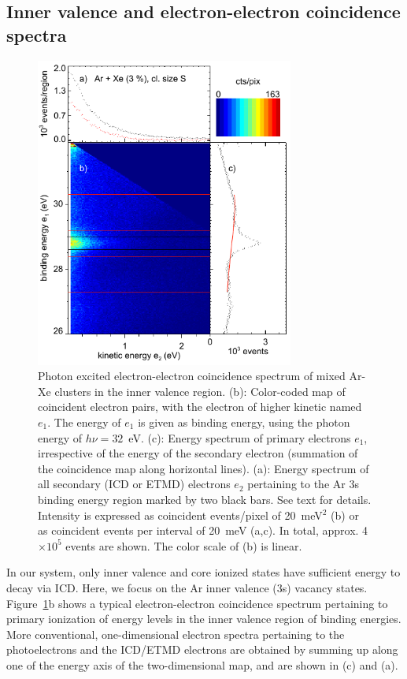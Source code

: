 \subsection{Inner valence and electron-electron coincidence spectra}
%
\begin{figure}[ht]
 \centering
 \includegraphics[width=8.5cm]{pics/figure_map.pdf}
 \caption{
Photon excited electron-electron coincidence spectrum of mixed Ar-Xe clusters in the inner valence region. 
(b): Color-coded map of coincident electron pairs, with the electron of higher kinetic named $e_1$. 
The energy of $e_1$ is given as binding energy, using the photon energy of $h\nu = 32$~eV. 
(c): Energy spectrum of primary electrons $e_1$, irrespective of the energy of the secondary electron (summation of the coincidence map along horizontal lines). 
(a): Energy spectrum of all secondary (ICD or ETMD) electrons $e_2$ pertaining to the Ar 3s binding energy region marked by two black bars. 
See text for details. 
Intensity is expressed as coincident events/pixel of 20~meV$^2$ (b) or as coincident events per interval of 20~meV (a,c). 
In total, approx. 4$\times 10^5$ events are shown. 
The color scale of (b) is linear.
 \label{figure:map}
 }
\end{figure}
%
In our system, only inner valence and core ionized states have sufficient energy to decay via ICD. 
Here, we focus on the Ar inner valence (3s) vacancy states. 
Figure\ \ref{figure:map}b shows a typical electron-electron coincidence spectrum pertaining to primary ionization of energy levels in the inner valence region of binding energies.
More conventional, one-dimensional electron spectra pertaining to the photoelectrons and the ICD/ETMD electrons are obtained by summing up along one of the energy axis of the two-dimensional map, and are shown in (c) and (a). 

